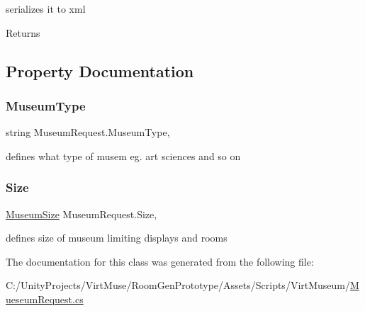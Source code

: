 serializes it to xml 

\begin{DoxyReturn}{Returns}

\end{DoxyReturn}


\subsection{Property Documentation}
\mbox{\label{class_museum_request_a55a4ab7c95751f54af3f8ced9d81ba76}} 
\subsubsection{\texorpdfstring{Museum\+Type}{MuseumType}}
{\footnotesize\ttfamily string Museum\+Request.\+Museum\+Type\hspace{0.3cm}{\ttfamily [get]}, {\ttfamily [set]}}



defines what type of musem eg. art sciences and so on 

\mbox{\label{class_museum_request_a82207d17f80d3a624e7784ffe21c6f43}} 
\subsubsection{\texorpdfstring{Size}{Size}}
{\footnotesize\ttfamily \mbox{\hyperlink{_mueseum_request_8cs_a462fa84e99cf703318040e54f14146a2}{Museum\+Size}} Museum\+Request.\+Size\hspace{0.3cm}{\ttfamily [get]}, {\ttfamily [set]}}



defines size of museum limiting displays and rooms 



The documentation for this class was generated from the following file\+:\begin{DoxyCompactItemize}
\item 
C\+:/\+Unity\+Projects/\+Virt\+Muse/\+Room\+Gen\+Prototype/\+Assets/\+Scripts/\+Virt\+Museum/\mbox{\hyperlink{_mueseum_request_8cs}{Mueseum\+Request.\+cs}}\end{DoxyCompactItemize}
